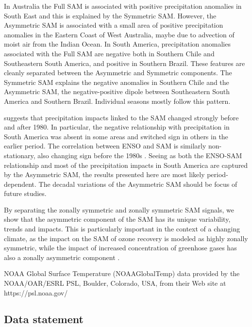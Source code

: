 \documentclass[smallextended]{svjour3}       %
\begin{document}
In Australia the Full SAM is associated with positive precipitation anomalies in South East and this is explained by the Symmetric SAM. However, the Asymmetric SAM is associated with a small area of positive precipitation anomalies in the Eastern Coast of West Australia, maybe due to advection of moist air from the Indian Ocean. In South America, precipitation anomalies associated with the Full SAM are negative both in Southern Chile and Southeastern South America, and positive in Southern Brazil. These features are cleanly separated between the Asymmetric and Symmetric components. The Symmetric SAM explains the negative anomalies in Southern Chile and the Asymmetric SAM, the negative-positive dipole between Southeastern South America and Southern Brazil. Individual seasons mostly follow this pattern.

\citet{silvestri2009} suggests that precipitation impacts linked to the SAM changed strongly before and after 1980. In particular, the negative relationship with precipitation in South America was absent in some areas and switched sign in others in the earlier period. The correlation between ENSO and SAM is similarly non-stationary, also changing sign before the 1980s \citep{fogt2006, clem2013}. Seeing as both the ENSO-SAM relationship and most of the precipitation impacts in South America are captured by the Asymmetric SAM, the results presented here are most likely period-dependent. The decadal variations of the Asymmetric SAM should be focus of future studies.

By separating the zonally symmetric and zonally symmetric SAM signals, we show that the asymmetric component of the SAM has its unique variability, trends and impacts. This is particularly important in the context of a changing climate, as the impact on the SAM of ozone recovery is modeled as highly zonally symmetric, while the impact of increased concentration of greenhose gases has also a zonally asymmetric component \citep{arblaster2006}.

\begin{acknowledgements}
NOAA Global Surface Temperature (NOAAGlobalTemp) data provided by the NOAA/OAR/ESRL PSL, Boulder, Colorado, USA, from their Web site at https://psl.noaa.gov/ 
\end{acknowledgements}

\hypertarget{data-statement}{%
\subsection{Data statement}\label{data-statement}}
\end{document}
